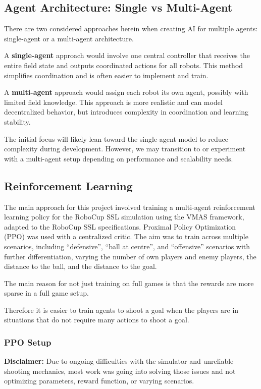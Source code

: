\subsection{Agent Architecture: Single vs Multi-Agent}

There are two considered approaches herein when creating AI for multiple agents: single-agent or a multi-agent architecture\cite{single/multi-agent}.

A \textbf{single-agent} approach would involve one central controller that receives the entire field state and outputs coordinated actions for all robots. This method simplifies coordination and is often easier to implement and train.

A \textbf{multi-agent} approach would assign each robot its own agent, possibly with limited field knowledge. This approach is more realistic and can model decentralized behavior, but introduces complexity in coordination and learning stability.

The initial focus will likely lean toward the single-agent model to reduce complexity during development. However, we may transition to or experiment with a multi-agent setup depending on performance and scalability needs.

\subsection{Reinforcement Learning}
The main approach for this project involved training a multi-agent reinforcement learning policy for the RoboCup SSL simulation using the VMAS framework, adapted to the RoboCup SSL specifications.  
Proximal Policy Optimization (PPO) was used with a centralized critic.  
The aim was to train across multiple scenarios, including ``defensive'', ``ball at centre'', and ``offensive'' scenarios with further differentiation, varying the number of own players and enemy players, the distance to the ball, and the distance to the goal.

The main reason for not just training on full games is that the rewards are more sparse in a full game setup.

Therefore it is easier to train agents to shoot a goal when the players are in situations that do not require many actions to shoot a goal.

\subsubsection{PPO Setup}
\textbf{Disclaimer:} Due to ongoing difficulties with the simulator and unreliable shooting mechanics, most work was going into solving those issues and not optimizing parameters, reward function, or varying scenarios.

